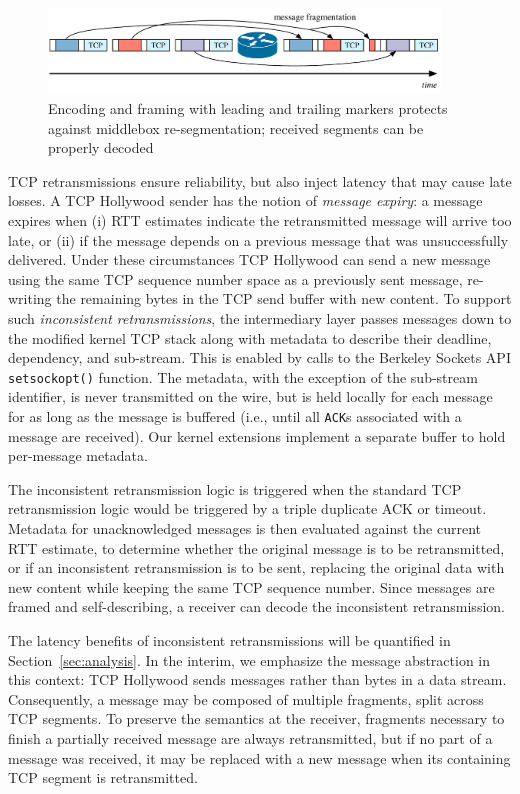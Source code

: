\begin{figure}[t]
 \centering
 \includegraphics[width=\columnwidth,height=0.9in]{figures/message-resegmentation.pdf}
 \caption{Encoding and framing with leading and trailing markers protects
 against middlebox re-segmentation; received segments can be properly decoded}
\label{diagram:resegmentation}
\end{figure}

TCP retransmissions ensure reliability, but also inject latency that may
cause late losses. A TCP Hollywood sender has the notion of \textit{message
expiry}: a message expires when (i) RTT estimates indicate the
retransmitted message will arrive too late, or (ii) if the message depends on a
previous message that was unsuccessfully delivered. Under these circumstances
TCP Hollywood can send a new message using the same TCP sequence number space
as a previously sent message, re-writing the remaining bytes in the TCP send buffer
with new content.
To support such \emph{inconsistent retransmissions}, the intermediary layer
passes messages down to the modified kernel TCP stack along with metadata
to describe their deadline, dependency, and sub-stream. This is enabled by
calls to the Berkeley Sockets API \texttt{setsockopt()} function.
The metadata, with the exception of the sub-stream identifier, is never
transmitted on the wire, but is held locally for each message for as long
as the message is buffered (i.e., until all \texttt{ACK}s associated with
a message are received). Our kernel extensions implement a separate buffer
to hold per-message metadata.

The inconsistent retransmission logic is triggered when the standard
TCP retransmission logic would be triggered by a triple duplicate ACK
or timeout. Metadata for unacknowledged messages is then evaluated
against the current RTT estimate, to determine whether the
original message is to be retransmitted, or if an inconsistent retransmission is
to be sent, replacing the original data with new content while keeping the
same TCP sequence number. Since messages are framed and self-describing, a
receiver can decode the inconsistent retransmission.

The latency benefits of inconsistent retransmissions will be quantified in
Section~\ref{sec:analysis}.  In the interim, we emphasize the
message abstraction in this context: TCP Hollywood sends messages rather
than bytes in a data stream. Consequently, a message may be composed of
multiple fragments, split across TCP segments. To preserve the semantics at
the receiver, fragments necessary to finish a partially received message
are always retransmitted, but if no part of a message was received, it may
be replaced with a new message when its containing TCP segment
is retransmitted.

